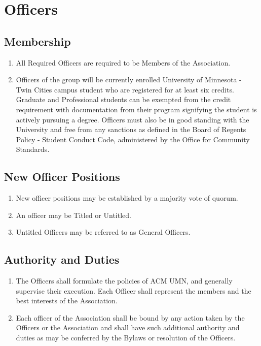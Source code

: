 \documentclass[12pt,letterpaper]{article}
\begin{document}
\section{Officers}

\subsection{Membership}
\begin{enumerate}
	\item All Required Officers are required to be Members of the Association.
	\item Officers of the group will be currently enrolled University of Minnesota -
				Twin Cities campus student who are registered for at least six credits.
				Graduate and Professional students can be exempted from the credit
				requirement with documentation from their program signifying the student is
				actively pursuing a degree. Officers must also be in good standing with the
				University and free from any sanctions as defined in the Board of Regents
				Policy - Student Conduct Code, administered by the Office for Community
				Standards. 
\end{enumerate}

\subsection{New Officer Positions}
\begin{enumerate}
	\item New officer positions may be established by a majority vote of quorum.
	\item An officer may be Titled or Untitled.
	\item Untitled Officers may be referred to as General Officers.
\end{enumerate}

\subsection{Authority and Duties}
\begin{enumerate}
	\item The Officers shall formulate the policies of ACM UMN, and generally supervise
				their execution. Each Officer shall represent the members and the best
				interests of the Association.
	\item Each officer of the Association shall be bound by any action taken by the
				Officers or the Association and shall have such additional authority and
				duties as may be conferred by the Bylaws or resolution of the Officers.
\end{enumerate}
\end{document}

